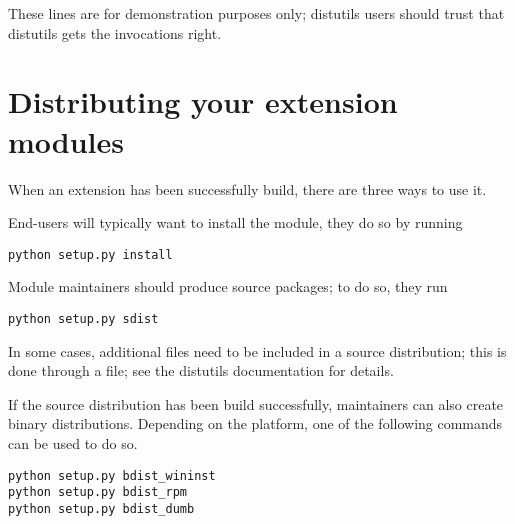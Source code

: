 These lines are for demonstration purposes only; distutils users
should trust that distutils gets the invocations right.

\section{Distributing your extension modules
     \label{distributing}}

When an extension has been successfully build, there are three ways to
use it.

End-users will typically want to install the module, they do so by
running

\begin{verbatim}
python setup.py install
\end{verbatim}

Module maintainers should produce source packages; to do so, they run

\begin{verbatim}
python setup.py sdist
\end{verbatim}

In some cases, additional files need to be included in a source
distribution; this is done through a  file; see the
distutils documentation for details.

If the source distribution has been build successfully, maintainers
can also create binary distributions. Depending on the platform, one
of the following commands can be used to do so.

\begin{verbatim}
python setup.py bdist_wininst
python setup.py bdist_rpm
python setup.py bdist_dumb
\end{verbatim}

